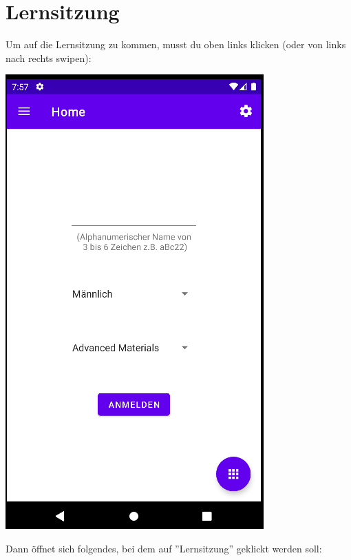 \documentclass{article}
\begin{document}
\section{Lernsitzung}
Um auf die Lernsitzung zu kommen, musst du oben links klicken (oder von links nach rechts swipen):
\begin{center}
    \includegraphics[scale=0.45]{start_reg.png}
\end{center}
Dann öffnet sich folgendes, bei dem auf ''Lernsitzung'' geklickt werden soll:
\end{document}
